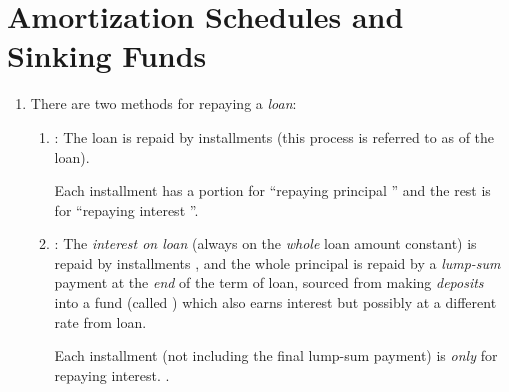 \section{Amortization Schedules and Sinking Funds}
\label{sect:amort-sinking-funds}
\begin{enumerate}
\item There are two methods for repaying a \emph{loan}:
\begin{enumerate}
\item {}: The loan is repaid by installments
 (this process is referred to as  of the
loan).

 Each installment  has a portion for
``repaying principal '' and the rest is for ``repaying interest
''.
\item {}: The \emph{interest on loan} (always on the
\emph{whole} loan amount  constant)  is repaid
by installments , and the whole principal  is
repaid by a \emph{lump-sum} payment at the \emph{end} of the term of loan,
sourced from making \emph{deposits} into a fund (called )
which also earns interest but possibly at a different rate from loan.

 Each installment (not including the final lump-sum
payment)  is \emph{only} for repaying interest.
.
\end{enumerate}
\end{enumerate}
